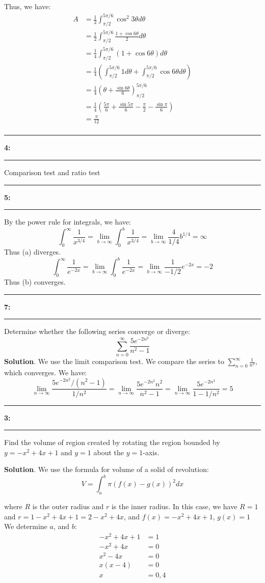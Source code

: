 \documentclass[11pt]{article}
\newcommand\question[2]{\vspace{.25in}\hrule\textbf{#1: #2}\vspace{.5em}\hrule\vspace{.10in}}
\begin{document}
Thus, we have:
\begin{align*}
    A &= \frac{1}{2}\int_{\pi/2}^{5\pi/6} \cos^2 3\theta d\theta\\
      &= \frac{1}{2}\int_{\pi/2}^{5\pi/6} \frac{1+\cos 6\theta}{2} d\theta\\
      &= \frac{1}{4}\int_{\pi/2}^{5\pi/6} (1+\cos 6\theta) d\theta\\
      &= \frac{1}{4}\left(\int_{\pi/2}^{5\pi/6} 1 d\theta + \int_{\pi/2}^{5\pi/6} \cos 6\theta d\theta\right)\\
      &= \frac{1}{4}\left(\theta + \frac{\sin 6\theta}{6}\right)_{\pi/2}^{5\pi/6}\\
      &= \frac{1}{4}\left(\frac{5\pi}{6} + \frac{\sin 5\pi}{6} - \frac{\pi}{2} - \frac{\sin \pi}{6}\right)\\
      &= \frac{\pi}{12}\\
\end{align*}

\question{4}{}
Comparison test and ratio test

\question{5}{}
By the power rule for integrals, we have:
\[\int_{0}^{\infty}\frac{1}{x^{3/4}}=\lim_{b\rightarrow\infty}\int_{0}^{b}\frac{1}{x^{3/4}} = \lim_{b\rightarrow\infty}\frac{4}{1/4}b^{1/4} = \infty\]
Thus (a) diverges.
\[\int_{0}^{\infty}\frac{1}{e^{-2x}}= \lim_{b\rightarrow\infty}\int_{0}^{b}\frac{1}{e^{-2x}} = \lim_{b\rightarrow\infty}\frac{1}{-1/2}e^{-2x} = -2\]
Thus (b) converges.

\question{7}{}
Determine whether the following series converge or diverge:
\[\sum_{n=0}^{\infty}\frac{5e^{-2n^2}}{n^2-1}\]
\textbf{Solution}.
We use the limit comparison test.  We compare the series to $\sum_{n=0}^{\infty}\frac{1}{n^2}$, which converges.  We have:
\[\lim_{n\rightarrow\infty}\frac{5e^{-2n^2}/(n^2-1)}{1/n^2} = \lim_{n\rightarrow\infty}\frac{5e^{-2n^2}n^2}{n^2-1} = \lim_{n\rightarrow\infty}\frac{5e^{-2n^2}}{1-1/n^2} = 5\]

\question{3}{}

Find the volume of region created by rotating the region bounded by $y=-x^2+4x+1$ and $y=1$ about the $y=1$-axis.

\textbf{Solution}.
We use the formula for volume of a solid of revolution:
\[V=\int_{a}^{b}\pi(f(x)-g(x))^2dx\]

where $R$ is the outer radius and $r$ is the inner radius.  In this case, we have $R=1$ and $r=1-x^2+4x+1=2-x^2+4x$, and $f(x)=-x^2+4x+1$, $g(x) = 1$ We determine $a$, and $b$:
\begin{align*}
    -x^2+4x+1 &= 1\\
    -x^2+4x &= 0\\
    x^2-4x &= 0\\
    x(x-4) &= 0\\
    x &= 0, 4\\
\end{align*}
\end{document}
